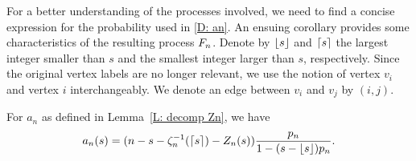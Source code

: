 For a better understanding of the processes involved, we need to find a concise expression for the probability used in \eqref{D: an}.
An ensuing corollary provides some characteristics of the resulting process $F_n$.
Denote by $\lfloor s\rfloor$ and $\lceil s\rceil$ the largest integer smaller than $s$ and the smallest integer larger than $s$, respectively.
Since the original vertex labels are no longer relevant,
we use the notion of vertex $v_i$ and vertex $i$ interchangeably.
We denote an edge between $v_i$ and $v_j$ by $(i,j)$.

\begin{lemma} \label{L: formula an}
	For $a_n$ as defined in Lemma~\ref{L: decomp Zn}, we have
	\begin{equation}
	a_n(s) = (n - s - \zeta^{-1}_n(\lceil s\rceil) - Z_n(s)) \frac{p_n}{1-(s-\lfloor s\rfloor)p_n} .
	\end{equation}
\end{lemma}

